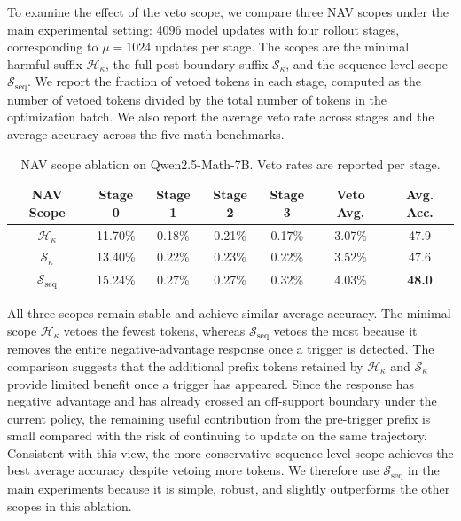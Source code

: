 To examine the effect of the veto scope, we compare three NAV scopes under the main experimental setting: 4096 model updates with four rollout stages, corresponding to $\mu=1024$ updates per stage. The scopes are the minimal harmful suffix $\mathcal H_\kappa$, the full post-boundary
suffix $\mathcal S_{\kappa}$, and the sequence-level scope
$\mathcal S_{\mathrm{seq}}$. We report
the fraction of vetoed tokens in each stage, computed as the number of vetoed
tokens divided by the total number of tokens in the optimization batch. We also
report the average veto rate across stages and the average accuracy across the five math benchmarks.

\begin{table}[!h]
\vspace{-8pt}
\centering
\caption{NAV scope ablation on Qwen2.5-Math-7B. Veto rates are reported per stage.}
\label{tab:nav_scope_ablation}
\begin{tabular}{ccccccc}
\toprule
NAV Scope & Stage 0 & Stage 1 & Stage 2 & Stage 3 & Veto Avg. & Avg. Acc. \\
\midrule
$\mathcal H_\kappa$
& 11.70\% & 0.18\% & 0.21\% & 0.17\% & 3.07\% & 47.9 \\
$\mathcal S_{\kappa}$
& 13.40\% & 0.22\% & 0.23\% & 0.22\% & 3.52\% & {47.6} \\
\rowcolor{gray!20}
$\mathcal S_{\mathrm{seq}}$ 
& 15.24\% & 0.27\% & 0.27\% & 0.32\% & 4.03\% & \textbf{48.0} \\
\bottomrule
\end{tabular}
\vspace{-2pt}
\end{table}

All three scopes remain stable and achieve similar average accuracy. The minimal scope $\mathcal H_\kappa$ vetoes the fewest tokens, whereas $\mathcal S_{\mathrm{seq}}$ vetoes the most because it removes the entire negative-advantage response once a trigger is detected. The comparison suggests that the additional prefix tokens retained by $\mathcal H_\kappa$ and $\mathcal S_{\kappa}$ provide limited benefit once a trigger has appeared. Since the response has negative advantage and has already crossed an off-support boundary under the current policy, the remaining useful contribution from the pre-trigger prefix is small compared with the risk of continuing to update on the same trajectory. Consistent with this view, the more conservative sequence-level scope achieves the best average accuracy despite vetoing more tokens. We therefore use $\mathcal S_{\mathrm{seq}}$ in the main experiments because it is simple, robust, and slightly outperforms the other scopes in this ablation.

